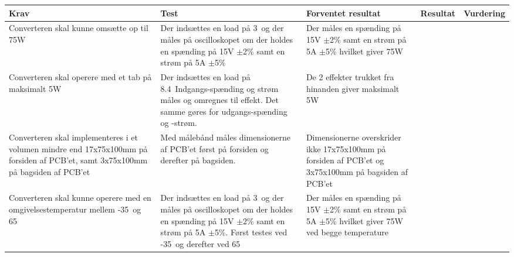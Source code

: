 \begin{tabularx}{\textwidth}{|X|X|X|X|X|}
	\hline
	\textbf{Krav} & \textbf{Test} & \textbf{Forventet resultat} & \textbf{Resultat} & \textbf{Vurdering} \\ \hline
	Converteren skal kunne omsætte op til 75W & Der indsættes en load på 3\ohm\ og der måles på oscilloskopet om der holdes en spænding på 15V $\pm$2\% samt en strøm på 5A $\pm$5\% & Der måles en spænding på 15V $\pm$2\% samt en strøm på 5A $\pm$5\% hvilket giver 75W && \\ \hline
	Converteren skal operere med et tab på maksimalt 5W & Der indsættes en load på 8.4\ohm\ Indgangs-spænding og strøm måles og omregnes til effekt. Det samme gøres for udgangs-spænding og -strøm. & De 2 effekter trukket fra hinanden giver maksimalt 5W && \\ \hline 
	Converteren skal implementeres i et volumen mindre end 17x75x100mm på forsiden af PCB'et, samt 3x75x100mm på bagsiden af PCB'et & Med målebånd måles dimensionerne af PCB'et først på forsiden og derefter på bagsiden. & Dimensionerne overskrider ikke 17x75x100mm på forsiden af PCB'et og 3x75x100mm på bagsiden af PCB'et && \\ \hline
	Converteren skal kunne operere med en omgivelsestemperatur mellem -35\degreeCelsius\ og 65\degreeCelsius\ & Der indsættes en load på 3\ohm\ og der måles på oscilloskopet om der holdes en spænding på 15V $\pm$2\% samt en strøm på 5A $\pm$5\%. Først testes ved -35\degreeCelsius\ og derefter ved 65\degreeCelsius\ & Der måles en spænding på 15V $\pm$2\% samt en strøm på 5A $\pm$5\% hvilket giver 75W ved begge temperature && \\ \hline

\end{tabularx}



